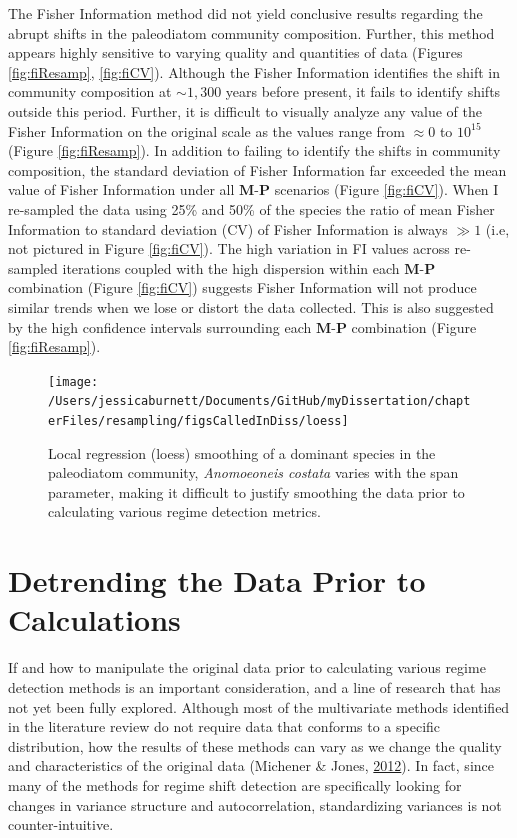 \documentclass[12pt,twoside,openany]{reedthesis}
\begin{document}
The Fisher Information method did not yield conclusive results regarding the abrupt shifts in the paleodiatom community composition. Further, this method appears highly sensitive to varying quality and quantities of data (Figures \ref{fig:fiResamp}, \ref{fig:fiCV}). Although the Fisher Information identifies the shift in community composition at \(\sim1,300\) years before present, it fails to identify shifts outside this period. Further, it is difficult to visually analyze any value of the Fisher Information on the original scale as the values range from \(\approx 0\) to \(10^{15}\) (Figure \ref{fig:fiResamp}). In addition to failing to identify the shifts in community composition, the standard deviation of Fisher Information far exceeded the mean value of Fisher Information under all \(\textbf{M}\)-\(\textbf{P}\) scenarios (Figure \ref{fig:fiCV}). When I re-sampled the data using 25\% and 50\% of the species the ratio of mean Fisher Information to standard deviation (CV) of Fisher Information is always \(\gg 1\) (i.e, not pictured in Figure \ref{fig:fiCV}). The high variation in FI values across re-sampled iterations coupled with the high dispersion within each \(\textbf{M}\)-\(\textbf{P}\) combination (Figure \ref{fig:fiCV}) suggests Fisher Information will not produce similar trends when we lose or distort the data collected. This is also suggested by the high confidence intervals surrounding each \(\textbf{M}\)-\(\textbf{P}\) combination (Figure \ref{fig:fiResamp}).


\begin{figure}
\texttt{[image: /Users/jessicaburnett/Documents/GitHub/myDissertation/chapterFiles/resampling/figsCalledInDiss/loess]} \caption{Local regression (loess) smoothing of a dominant species in the paleodiatom community, \emph{Anomoeoneis costata} varies with the span parameter, making it difficult to justify smoothing the data prior to calculating various regime detection metrics.}\label{fig:loessEx}
\end{figure}
\hypertarget{detrending-the-data-prior-to-calculations}{%
\section{Detrending the Data Prior to Calculations}\label{detrending-the-data-prior-to-calculations}}

If and how to manipulate the original data prior to calculating various regime detection methods is an important consideration, and a line of research that has not yet been fully explored. Although most of the multivariate methods identified in the literature review do not require data that conforms to a specific distribution, how the results of these methods can vary as we change the quality and characteristics of the original data (Michener \& Jones, \protect\hyperlink{ref-michener2012ecoinformatics}{2012}). In fact, since many of the methods for regime shift detection are specifically looking for changes in variance structure and autocorrelation, standardizing variances is not counter-intuitive.
\end{document}
